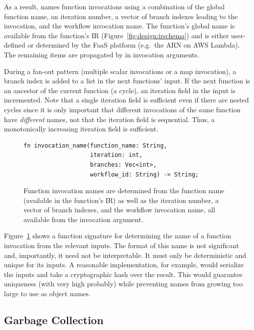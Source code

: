 As a result, \name{} names function invocations using a combination of the
global function name, an iteration number, a vector of branch indexes leading to
the invocation, and the workflow invocation name. The function's global name is
available from the function's IR (Figure~\ref{fig:design:irschema}) and is
either user-defined or determined by the FaaS platform (e.g.\ the ARN on AWS
Lambda). The remaining items are propagated by \name{} in invocation arguments.

During a fan-out pattern (multiple scalar invocations or a map invocation), a
branch index is added to a list in the next functions' input. If the next
function is an ancestor of the current function (a cycle), an iteration field in
the input is incremented. Note that a single iteration field is sufficient even
if there are nested cycles since it is only important that different invocations
of the same function have \emph{different} names, not that the iteration field
is sequential. Thus, a monotonically increasing iteration field is sufficient.

\begin{figure}
\begin{verbatim}
fn invocation_name(function_name: String,
                   iteration: int,
                   branches: Vec<int>,
                   workflow_id: String) -> String;
\end{verbatim}
\label{fig:design:names}
\caption{Function invocation names are determined from the function name
(available in the function's IR) as well as the iteration number, a vector of
branch indexes, and the workflow invocation name, all available from the
invocation argument.}
\end{figure}

Figure~\ref{fig:design:names} shows a function signature for determining the name of a
function invocation from the relevant inputs. The format of this name is not
significant and, importantly, it need not be interpretable. It must only be
deterministic and unique for its inputs. A reasonable implementation, for
example, would serialize the inputs and take a cryptographic hash over the
result. This would guarantee uniqueness (with very high probably) while
preventing names from growing too large to use as object names.

\subsection{Garbage Collection}\label{sec:design:garbage}

